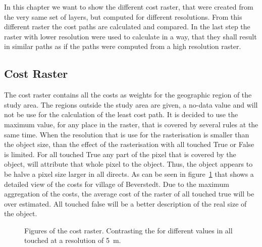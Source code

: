 
In this chapter we want to show the different cost raster, that were created from the very same set of layers,
but computed for different resolutions.
From this different raster the cost paths are calculated and compared.
In the last step the raster with lower resolution were used to calculate in a way, that they shall result in
similar paths as if the paths were computed from a high resolution raster.

\subsection{Cost Raster}\label{subsec:cost-raster}

The cost raster contains all the costs as weights for the geographic region of the study area.
The regions outside the study area are given, a no-data value and will not be use for the calculation of the least cost path.
It is decided to use the maximum value, for any place in the raster, that is covered by several rules at the same time.
When the resolution that is use for the rasterisation is smaller than the object size, than the effect of the rasterisation with all touched True or False is limited.
For all touched True any part of the pixel that is covered by the object, will attribute that whole pixel to the object.
Thus, the object appears to be halve a pixel size larger in all directs.
As can be seen in figure~\ref{fig:costs_5m} that shows a detailed view of the costs for village of Beverstedt.
Due to the maximum aggregation of the costs, the average cost of the raster of all touched true will be over estimated.
All touched false will be a better description of the real size of the object.
\begin{figure}
	\centering

	\qquad
	\caption{Figures of the cost raster. Contrasting the for different values in all touched at a resolution of 5~m.}
	\label{fig:costs_5m}
\end{figure}

